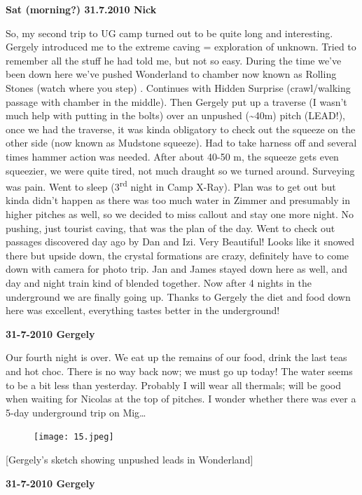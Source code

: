 \textbf{Sat (morning?) 31.7.2010 Nick}

So, my second trip to UG camp turned out to be quite long and
interesting. Gergely introduced me to the extreme caving = exploration
of unknown. Tried to remember all the stuff he had told me, but not so
easy. During the time we've been down here we've pushed Wonderland to
chamber now known as Rolling Stones (watch where you step) . Continues
with Hidden Surprise (crawl/walking passage with chamber in the middle).
Then Gergely put up a traverse (I wasn't much help with putting in the
bolts) over an unpushed (\textasciitilde{}40m) pitch (LEAD!), once we
had the traverse, it was kinda obligatory to check out the squeeze on
the other side (now known as Mudstone squeeze). Had to take harness off
and several times hammer action was needed. After about 40-50 m, the
squeeze gets even squeezier, we were quite tired, not much draught so we
turned around. Surveying was pain. Went to sleep (3\textsuperscript{rd}
night in Camp X-Ray). Plan was to get out but kinda didn't happen as
there was too much water in Zimmer and presumably in higher pitches as
well, so we decided to miss callout and stay one more night. No pushing,
just tourist caving, that was the plan of the day. Went to check out
passages discovered day ago by Dan and Izi. Very Beautiful! Looks like
it snowed there but upside down, the crystal formations are crazy,
definitely have to come down with camera for photo trip. Jan and James
stayed down here as well, and day and night train kind of blended
together. Now after 4 nights in the underground we are finally going up.
Thanks to Gergely the diet and food down here was excellent, everything
tastes better in the underground!

\textbf{31-7-2010 Gergely}

Our fourth night is over. We eat up the remains of our food, drink the
last teas and hot choc. There is no way back now; we must go up today!
The water seems to be a bit less than yesterday. Probably I will wear
all thermals; will be good when waiting for Nicolas at the top of
pitches. I wonder whether there was ever a 5-day underground trip on
Mig\ldots{}

\begin{figure}[htbp]
\centering
\texttt{[image: 15.jpeg]}
\caption{}
\end{figure}

{[}Gergely's sketch showing unpushed leads in Wonderland{]}

\textbf{31-7-2010 Gergely}

